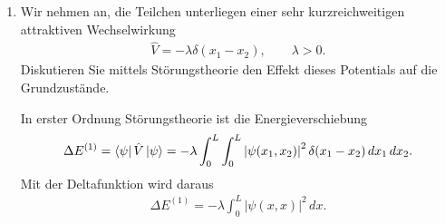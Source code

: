 \documentclass[11pt,a4paper]{scrartcl}
\newcommand{\abs}[1]{\left| #1 \right|}
\newcommand{\op}[1]{\hat{#1}}
\newcommand{\eps}{\varepsilon}
\begin{document}
\begin{enumerate}[label=(\alph*)]
\begin{calculationbox}
            \begin{calculationbox}[title=Kleinste symmetrische Ortswellenfunktion]
                Für den symmetrischen Ortsanteil dürfen beide Fermionen denselben Einteilchen-Ortszustand besetzen, weil der Spinanteil schon antisymmetrisch ist. Der niedrigste Zustand ist daher
                \begin{align*}
                    \psi_S(x_1,x_2)
                    =
                    \varphi_1(x_1)\varphi_1(x_2).
                \end{align*}
            \end{calculationbox}

            \begin{calculationbox}[title=Grundzustandsenergie]
                Die Energie ist
                \begin{align*}
                    E_S^{(0)}
                    &=\eps_1+\eps_1\\
                    &=2\frac{\hbar^2\pi^2}{2mL^2}\\
                    &=\frac{\hbar^2\pi^2}{mL^2}.
                \end{align*}

                \begin{solutionbox}[title=Singulett-Grundzustand]
                    \begin{align*}
                        \Psi_S(x_1,x_2)
                        =
                        \varphi_1(x_1)\varphi_1(x_2)\chi_{0,0},
                        \qquad
                        E_S^{(0)}=\frac{\hbar^2\pi^2}{mL^2}.
                    \end{align*}
                \end{solutionbox}
            \end{calculationbox}
        \end{calculationbox}

        \item Wir nehmen an, die Teilchen unterliegen einer sehr kurzreichweitigen attraktiven Wechselwirkung
        \begin{align*}
            \op V=-\lambda\delta(x_1-x_2),
            \qquad \lambda>0.
        \end{align*}
        Diskutieren Sie mittels Störungstheorie den Effekt dieses Potentials auf die Grundzustände.

        \begin{calculationbox}
            In erster Ordnung Störungstheorie ist die Energieverschiebung
            \begin{align*}
                \Delta E^{(1)}
                =
                \bra{\psi}\op V\ket{\psi}
                =
                -\lambda
                \int_0^L\int_0^L
                \abs{\psi(x_1,x_2)}^2\delta(x_1-x_2)\,dx_1\,dx_2.
            \end{align*}
            Mit der Deltafunktion wird daraus
            \begin{align*}
                \Delta E^{(1)}
                =
                -\lambda\int_0^L\abs{\psi(x,x)}^2\,dx.
            \end{align*}


\end{calculationbox}
\end{enumerate}
\end{document}
